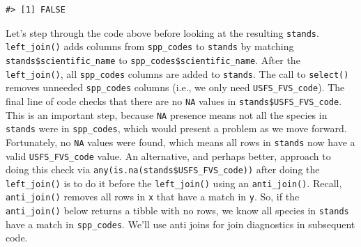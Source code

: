 \documentclass[
  11pt,
]{krantz}
\newenvironment{Shaded}{\begin{snugshade}}{\end{snugshade}}
\newcommand{\CommentTok}[1]{\textcolor[rgb]{0.56,0.35,0.01}{\textit{#1}}}
\newcommand{\DataTypeTok}[1]{\textcolor[rgb]{0.13,0.29,0.53}{#1}}
\newcommand{\KeywordTok}[1]{\textcolor[rgb]{0.13,0.29,0.53}{\textbf{#1}}}
\newcommand{\NormalTok}[1]{#1}
\newcommand{\OperatorTok}[1]{\textcolor[rgb]{0.81,0.36,0.00}{\textbf{#1}}}
\newcommand{\StringTok}[1]{\textcolor[rgb]{0.31,0.60,0.02}{#1}}
\theoremstyle{definition}
\theoremstyle{definition}
\theoremstyle{definition}
\theoremstyle{definition}
\theoremstyle{remark}
\begin{document}
\begin{Shaded}
\end{Shaded}

\begin{verbatim}
#> [1] FALSE
\end{verbatim}

Let's step through the code above before looking at the resulting \texttt{stands}. \texttt{left\_join()} adds columns from \texttt{spp\_codes} to \texttt{stands} by matching \texttt{stands\$scientific\_name} to \texttt{spp\_codes\$scientific\_name}. After the \texttt{left\_join()}, all \texttt{spp\_codes} columns are added to \texttt{stands}. The call to \texttt{select()} removes unneeded \texttt{spp\_codes} columns (i.e., we only need \texttt{USFS\_FVS\_code}). The final line of code checks that there are no \texttt{NA} values in \texttt{stands\$USFS\_FVS\_code}. This is an important step, because \texttt{NA} presence means not all the species in \texttt{stands} were in \texttt{spp\_codes}, which would present a problem as we move forward. Fortunately, no \texttt{NA} values were found, which means all rows in \texttt{stands} now have a valid \texttt{USFS\_FVS\_code} value. An alternative, and perhaps better, approach to doing this check via \texttt{any(is.na(stands\$USFS\_FVS\_code))} after doing the \texttt{left\_join()} is to do it before the \texttt{left\_join()} using an \texttt{anti\_join()}. Recall, \texttt{anti\_join()} removes all rows in \texttt{x} that have a match in \texttt{y}. So, if the \texttt{anti\_join()} below returns a tibble with no rows, we know all species in \texttt{stands} have a match in \texttt{spp\_codes}. We'll use anti joins for join diagnostics in subsequent code.
\end{document}
